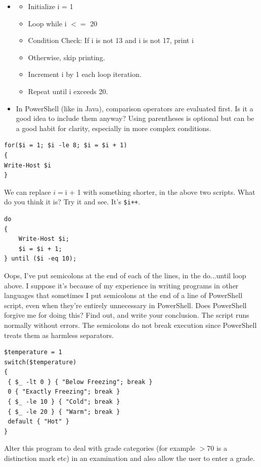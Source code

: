 \documentclass[a4paper]{article}
\begin{document}
\begin{itemize}
    \item \begin{itemize}
        \item Initialize i = 1
        \item Loop while i $<=$ 20
        \item Condition Check: If i is not 13 and i is not 17, print i
        \item Otherwise, skip printing.
        \item Increment i by 1 each loop iteration.
        \item Repeat until i exceeds 20.
    \end{itemize}
    \item In PowerShell (like in Java), comparison operators are evaluated first. Is it a good idea to include them anyway?
     Using parentheses is optional but can be a good habit for clarity, especially in more complex conditions.
\end{itemize}
\begin{verbatim}   
for($i = 1; $i -le 8; $i = $i + 1)
{
Write-Host $i
}
\end{verbatim}
\textcolor{green!50!black}{
We can replace $i = $i + 1 with something shorter, in the above two
scripts. What do you think it is? Try it and see.
}
It's \texttt{\$i++}.
\begin{verbatim}
do
{
    Write-Host $i;
    $i = $i + 1;
} until ($i -eq 10);
\end{verbatim}
\textcolor{green!50!black}{
Oops, I've put semicolons at the end of each of the lines, in the do...until
loop above. I suppose it's because of my experience in writing programs in other
languages that sometimes I put semicolons at the end of a line of PowerShell script,
even when they're entirely unnecessary in PowerShell. Does PowerShell forgive me
for doing this? Find out, and write your conclusion.
}
The script runs normally without errors. The semicolons do not break execution since PowerShell treats them as harmless separators.
\begin{verbatim}
$temperature = 1
switch($temperature)
{
 { $_ -lt 0 } { "Below Freezing"; break }
 0 { "Exactly Freezing"; break }
 { $_ -le 10 } { "Cold"; break }
 { $_ -le 20 } { "Warm"; break }
 default { "Hot" }
}
\end{verbatim}
\textcolor{green!50!black}{
    Alter this program to deal with grade categories (for example $>$70 is a
    distinction mark etc) in an examination and also allow the user to enter a grade.
}
\end{document}
